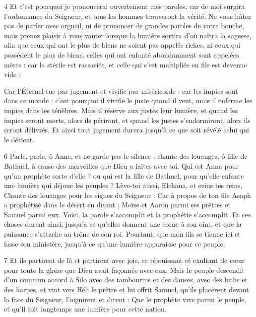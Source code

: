 \par 4 Et c'est pourquoi je prononcerai ouvertement mes paroles, car de moi surgira l'ordonnance du Seigneur, et tous les hommes trouveront la vérité. Ne vous hâtez pas de parler avec orgueil, ni de prononcer de grandes paroles de votre bouche, mais prenez plaisir à vous vanter lorsque la lumière sortira d'où naîtra la sagesse, afin que ceux qui ont le plus de biens ne soient pas appelés riches, ni ceux qui possèdent le plus de biens. celles qui ont enfanté abondamment sont appelées mères : car la stérile est rassasiée, et celle qui s'est multipliée en fils est devenue vide ;

\par Car l'Éternel tue par jugement et vivifie par miséricorde ; car les impies sont dans ce monde ; c'est pourquoi il vivifie le juste quand il veut, mais il enferme les impies dans les ténèbres. Mais il réserve aux justes leur lumière, et quand les impies seront morts, alors ils périront, et quand les justes s'endormiront, alors ils seront délivrés. Et ainsi tout jugement durera jusqu'à ce que soit révélé celui qui le détient.

\par 6 Parle, parle, ô Anne, et ne garde pas le silence : chante des louanges, ô fille de Bathuel, à cause des merveilles que Dieu a faites avec toi. Qui est Anna pour qu'un prophète sorte d'elle ? ou qui est la fille de Bathuel, pour qu'elle enfante une lumière qui déjoue les peuples ? Lève-toi aussi, Elchana, et ceins tes reins. Chante des louanges pour les signes du Seigneur : Car à propos de ton fils Asaph a prophétisé dans le désert en disant : Moïse et Aaron parmi ses prêtres et Samuel parmi eux. Voici, la parole s'accomplit et la prophétie s'accomplit. Et ces choses durent ainsi, jusqu'à ce qu'elles donnent une corne à son oint, et que la puissance s'attache au trône de son roi. Pourtant, que mon fils se tienne ici et fasse son ministère, jusqu'à ce qu'une lumière apparaisse pour ce peuple.

\par 7 Et ils partirent de là et partirent avec joie, se réjouissant et exultant de cœur pour toute la gloire que Dieu avait façonnée avec eux. Mais le peuple descendit d'un commun accord à Silo avec des tambourins et des danses, avec des luths et des harpes, et vint vers Héli le prêtre et lui offrit Samuel, qu'ils placèrent devant la face du Seigneur, l'oignirent et dirent : Que le prophète vive parmi le peuple, et qu'il soit longtemps une lumière pour cette nation.

